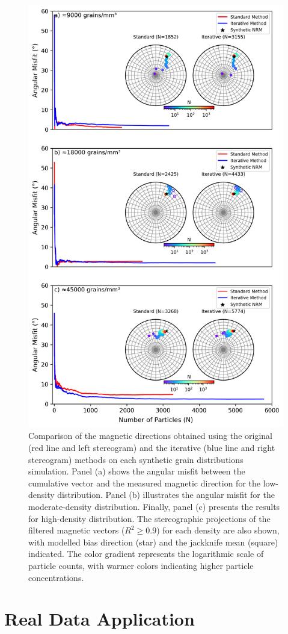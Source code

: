\begin{figure}[tb!]
  \centering
  \includegraphics[width=0.7\linewidth]{paper/figures/synthetic-different-densities-stereoplot.png}
  \caption{
Comparison of the magnetic directions obtained using the original (red line and left stereogram) and the iterative (blue line and right stereogram) methods on each synthetic grain distributions simulation. Panel (a) shows the angular misfit between the cumulative vector and the measured magnetic direction for the low-density distribution. Panel (b) illustrates the angular misfit for the moderate-density distribution. Finally, panel (c) presents the results for high-density distribution. The stereographic projections of the filtered magnetic vectors ($R^2 \geq 0.9$) for each density are also shown, with modelled bias direction (star) and the jackknife mean (square) indicated. The color gradient represents the logarithmic scale of particle counts, with warmer colors indicating higher particle concentrations.
  }
  \label{synthetic-data-stereograms}
\end{figure}


\section{Real Data Application}


